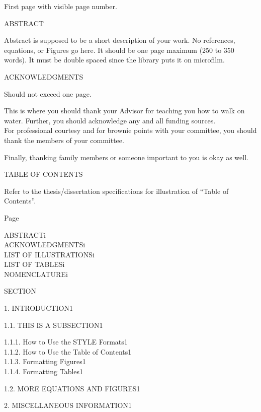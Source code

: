 \documentclass{article}
\newcommand{\tab}{\hspace{5mm}}
\begin{document}
First page with visible page number.

ABSTRACT


Abstract is supposed to be a short description of your work. 
No references, equations, or Figures go here. It should be one 
page maximum (250 to 350 words). It must be double spaced since 
the library puts it on microfilm.

\newpage

\begin{center}
ACKNOWLEDGMENTS


\end{center}


Should not exceed one page.

This is where you should thank your Advisor for teaching you 
how to walk on water. Further, you should acknowledge any and 
all funding sources. \\
For professional courtesy and for brownie points with your committee, 
you should thank the members of your committee. 


Finally, thanking family members or someone important to you 
is okay as well.


\newpage

\begin{center}
TABLE OF CONTENTS


\end{center}

Refer to the thesis/dissertation specifications for illustration 
of ``Table of Contents''.

Page


ABSTRACT\tab i\\
ACKNOWLEDGMENTS\tab i\\
LIST OF ILLUSTRATIONS\tab i\\
LIST OF TABLES\tab i\\
NOMENCLATURE\tab i


SECTION


1. INTRODUCTION\tab 1


1.1. THIS IS A SUBSECTION\tab 1


1.1.1. How to Use the STYLE Formats\tab 1\\
1.1.2. How to Use the Table of Contents\tab 1\\
1.1.3. Formatting Figures\tab 1\\
1.1.4. Formatting Tables\tab 1


1.2. MORE EQUATIONS AND FIGURES\tab 1


2. MISCELLANEOUS INFORMATION\tab 1
\end{document}
